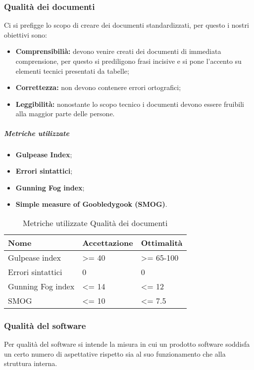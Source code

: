 \subsubsection{Qualità dei documenti}
Ci si prefigge lo scopo di creare dei documenti standardizzati, per questo i nostri obiettivi sono:
\begin{itemize}
	\item{\textbf{Comprensibilià:} devono venire creati dei documenti di immediata comprensione, per questo si prediligono frasi incisive e si pone l'accento su elementi tecnici presentati da tabelle;}
	\item{\textbf{Correttezza:} non devono contenere errori ortografici;}
	\item{\textbf{Leggibilità:} nonostante lo scopo tecnico i documenti devono essere fruibili alla maggior parte delle persone.}
\end{itemize}
\vspace{0.8cm}
\subparagraph{Metriche utilizzate}
\begin{itemize}
	\item{\textbf{Gulpease Index\pedice};}
	\item{\textbf{Errori sintattici};}
	\item{\textbf{Gunning Fog index\pedice};}
	\item{\textbf{Simple measure of Goobledygook (SMOG)\pedice}.}
\end{itemize}
\begin{table}[H]
	\centering
	\renewcommand{\arraystretch}{2} 
		\begin{tabular}{|l|l|l|}
			\rowcolor{orange!50}
			\hline
			\textbf{Nome} & \textbf{Accettazione} & \textbf{Ottimalità} \\ \hline
			Gulpease index    &   \textgreater= 40   &     \textgreater= 65-100       \\ \hline
			Errori sintattici     &  0    &   0      \\ \hline
			Gunning Fog index    &     \textless= 14       &   \textless= 12   \\ \hline
			SMOG                  &              \textless= 10                                 &                         \textless= 7.5                   \\ \hline
		\end{tabular}
	\caption{Metriche utilizzate Qualità dei documenti}
\end{table}
\subsubsection{Qualità del software}
Per qualità del software si intende la misura in cui un prodotto software soddisfa un certo numero di aspettative rispetto sia al suo funzionamento che alla struttura interna. 

